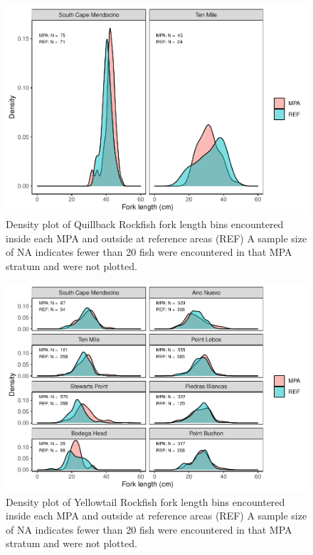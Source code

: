 \documentclass[
]{article}
\begin{document}
\begin{figure}
\centering
\includegraphics{CCRFP_available_data_for_assessments_files/figure-latex/lengths-3.pdf}
\caption{\label{fig:lengths-3}Density plot of Quillback Rockfish fork length bins encountered inside each MPA and outside at reference areas (REF) A sample size of NA indicates fewer than 20 fish were encountered in that MPA stratum and were not plotted.}
\end{figure}

\begin{figure}
\centering
\includegraphics{CCRFP_available_data_for_assessments_files/figure-latex/lengths-4.pdf}
\caption{\label{fig:lengths-4}Density plot of Yellowtail Rockfish fork length bins encountered inside each MPA and outside at reference areas (REF) A sample size of NA indicates fewer than 20 fish were encountered in that MPA stratum and were not plotted.}
\end{figure}

\FloatBarrier
\end{document}
